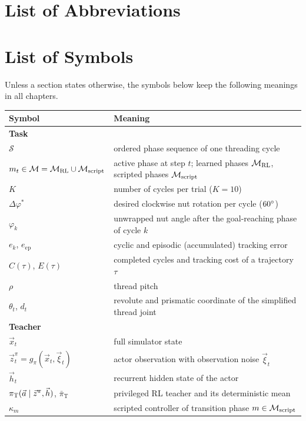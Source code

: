 \chapter*{List of Abbreviations}%
%
\printacronyms[heading=none]%
\cleardoublepage%
%
\chapter*{List of Symbols}%
%
Unless a section states otherwise, the symbols below keep the following meanings in all chapters.
\begin{center}
\begin{tabular}{lp{10.5cm}}
\toprule
Symbol & Meaning \\
\midrule
\multicolumn{2}{l}{\textbf{Task}} \\
$\mathcal{S}$ & ordered phase sequence of one threading cycle \\
$m_t \in \mathcal{M} = \mathcal{M}_{\mathrm{RL}} \cup \mathcal{M}_{\mathrm{script}}$ & active phase at step $t$; learned phases $\mathcal{M}_{\mathrm{RL}}$, scripted phases $\mathcal{M}_{\mathrm{script}}$ \\
$K$ & number of cycles per trial ($K=10$) \\
$\Delta\varphi^{*}$ & desired clockwise nut rotation per cycle ($60^\circ$) \\
$\varphi_k$ & unwrapped nut angle after the goal-reaching phase of cycle $k$ \\
$e_k$, $e_{\mathrm{ep}}$ & cyclic and episodic (accumulated) tracking error \\
$C(\tau)$, $E(\tau)$ & completed cycles and tracking cost of a trajectory $\tau$ \\
$\rho$ & thread pitch \\
$\theta_t$, $d_t$ & revolute and prismatic coordinate of the simplified thread joint \\
\multicolumn{2}{l}{\textbf{Teacher}} \\
$\vec{x}_t$ & full simulator state \\
$\vec{z}^{\pi}_t = g_\pi(\vec{x}_t,\vec{\xi}_t)$ & actor observation with observation noise $\vec{\xi}_t$ \\
$\vec{h}_t$ & recurrent hidden state of the actor \\
$\pi_{\mathrm{T}}(\vec{a}\mid\vec{z}^{\pi},\vec{h})$, $\bar{\pi}_{\mathrm{T}}$ & privileged RL teacher and its deterministic mean \\
$\kappa_m$ & scripted controller of transition phase $m\in\mathcal{M}_{\mathrm{script}}$ \\

\end{tabular}
\end{center}
